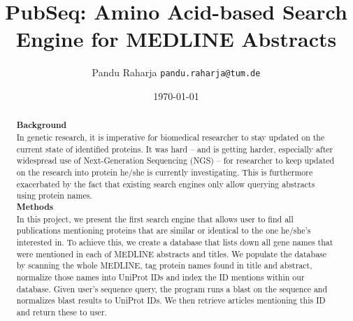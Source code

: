 \documentclass[a4paper,
  12pt,
  twoside
  ]{report}
\begin{document}
\title{PubSeq: Amino Acid-based Search Engine for MEDLINE Abstracts}
\author{Pandu Raharja
  \texttt{pandu.raharja@tum.de}}
  
\date{\today}
\maketitle

\begin{abstract}
\textbf{Background}\\
In genetic research, it is imperative for biomedical researcher to stay updated on the current  state of identified proteins. It was hard -- and is getting harder, especially after widespread use of Next-Generation Sequencing (NGS) -- for researcher to keep updated on the research into protein he/she is currently investigating. This is furthermore exacerbated by the fact that existing search engines only allow querying abstracts using protein names.\\
\noindent
\textbf{Methods}\\
In this project, we present the first search engine that allows user to find all publications mentioning proteins that are similar or identical to the one he/she's interested in. To achieve this, we create a database that lists down all gene names that were mentioned in each of MEDLINE abstracts and titles. We populate the database by scanning the whole MEDLINE, tag protein names found in title and abstract, normalize those names into UniProt IDs and index the ID mentions within our database. Given user's sequence query, the program runs a blast on the sequence and normalizes blast results to UniProt IDs. We then retrieve articles mentioning this ID and return 
these to user.
\end{abstract}
\end{document}
